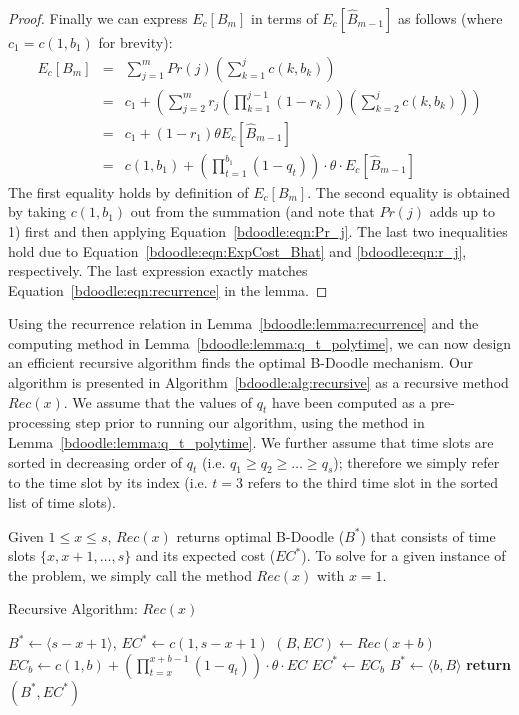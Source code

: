 \begin{proof}
Finally we can express $E_c[B_m]$ in terms of $E_c[\hat{B}_{m-1}]$ as follows (where $c_1 = c(1, b_1)$ for brevity):
\begin{eqnarray*} 
E_c[B_{m}]
&=& \sum_{j=1}^{m} Pr(j) \left(\sum_{k=1}^{j} c(k, b_k)\right) \\
&=& c_1 + \left(\sum_{j=2}^{m} r_j \left(\prod_{k=1}^{j-1} (1 - r_k)\right) \left(\sum_{k=2}^{j} c(k, b_k)\right) \right) \\
&=& c_1 + (1-r_1)\theta E_c[\hat{B}_{m-1}] \\
&=& c(1, b_1) + \left(\prod_{t=1}^{b_1} (1-q_t) \right)\cdot \theta \cdot E_c[\hat{B}_{m-1}] 
\end{eqnarray*}
The first equality holds by definition of $E_c[B_{m}]$. The second equality is obtained by taking $c(1, b_1)$ out from the summation (and note that $Pr(j)$ adds up to 1) first and then applying Equation~\ref{bdoodle:eqn:Pr_j}. The last two inequalities hold due to Equation~\ref{bdoodle:eqn:ExpCost_Bhat} and \ref{bdoodle:eqn:r_j}, respectively. 
The last expression exactly  matches Equation~\ref{bdoodle:eqn:recurrence} in the lemma.
 
\end{proof}

Using the recurrence relation in Lemma~\ref{bdoodle:lemma:recurrence} and the computing method in Lemma~\ref{bdoodle:lemma:q_t_polytime}, we can now design an efficient recursive algorithm finds the optimal B-Doodle mechanism. Our algorithm is presented in Algorithm~\ref{bdoodle:alg:recursive} as a recursive method $Rec(x)$. We assume that the values of $q_t$ have been computed as a pre-processing step prior to running our algorithm, using the method in Lemma~\ref{bdoodle:lemma:q_t_polytime}. We further assume that time slots are sorted in decreasing order of $q_t$ (i.e. $q_1 \geq q_2 \geq \dots \geq q_{s}$); therefore we simply refer to the time slot by its index (i.e. $t = 3$ refers to the third time slot in the sorted list of time slots).

Given $1 \leq x \leq s$, $Rec(x)$ returns optimal B-Doodle ($B^*$) that consists of time slots $\{x, x+1, \dots, s\}$ and its expected cost ($EC^*$). To solve for a given instance of the problem, we simply call the method $Rec(x)$ with $x = 1$.

\begin{algorithm}
\caption{Recursive Algorithm: $Rec(x)$}
\label{bdoodle:alg:recursive}
\begin{algorithmic}[1]
	\State ${B}^* \gets \langle s-x+1 \rangle$, $EC^* \gets c(1, s-x+1)$
		\State $({B}, EC) \gets Rec( x+b )$
		\State $EC_b \gets c(1, b) + \left(\prod_{t=x}^{x+b-1} (1 - q_t)\right)\cdot \theta \cdot EC$
			\State $EC^* \gets EC_b$
			\State $B^* \gets \langle b, {B} \rangle$
		\EndIf
	\EndFor
	\State \textbf{return} $({B}^*, EC^*)$
\end{algorithmic}
\end{algorithm}

